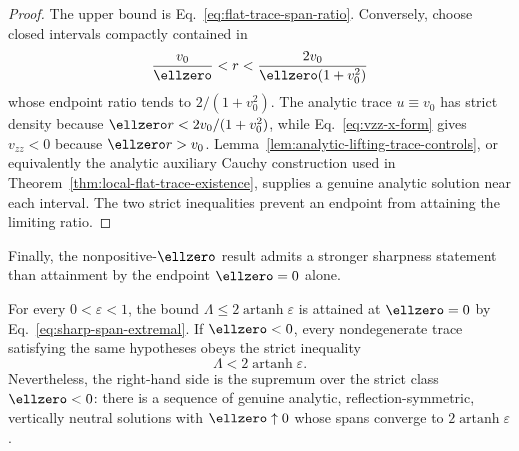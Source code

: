 \begin{proof}
The upper bound is Eq.~\eqref{eq:flat-trace-span-ratio}. Conversely, choose
closed intervals compactly contained in
$$
\frac{v_0}{\ellzero}<r<
\frac{2v_0}{\ellzero(1+v_0^2)}
$$
whose endpoint ratio tends to $2/(1+v_0^2)$. The analytic trace
$u\equiv v_0$ has strict density because
$\ellzero r<2v_0/(1+v_0^2)$, while
Eq.~\eqref{eq:vzz-x-form} gives $v_{zz}<0$ because
$\ellzero r>v_0$. Lemma~\ref{lem:analytic-lifting-trace-controls}, or
equivalently the analytic auxiliary Cauchy construction used in
Theorem~\ref{thm:local-flat-trace-existence}, supplies a genuine analytic
solution near each interval. The two strict inequalities prevent an
endpoint from attaining the limiting ratio.
\end{proof}

Finally, the nonpositive-$\ellzero$ result admits a stronger sharpness
statement than attainment by the endpoint $\ellzero=0$ alone.

\begin{proposition}
\label{prop:strict-negative-l-asymptotic-sharpness}
For every $0<\varepsilon<1$, the bound
$\Lambda\leqslant2\operatorname{artanh}\varepsilon$ is attained at
$\ellzero=0$ by Eq.~\eqref{eq:sharp-span-extremal}. If
$\ellzero<0$, every nondegenerate trace satisfying the same hypotheses
obeys the strict inequality
\begin{equation}
\Lambda<2\operatorname{artanh}\varepsilon.
\label{eq:strict-negative-l-span}
\end{equation}
Nevertheless, the right-hand side is the supremum over the strict class
$\ellzero<0$: there is a sequence of genuine analytic, reflection-symmetric,
vertically neutral solutions with $\ellzero\uparrow0$ whose spans converge
to $2\operatorname{artanh}\varepsilon$.
\end{proposition}

